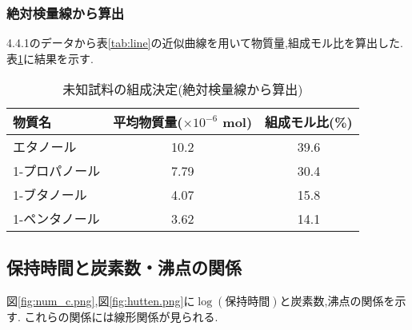 \subsubsection{絶対検量線から算出}
4.4.1のデータから表\ref{tab:line}の近似曲線を用いて物質量,組成モル比を算出した.
表\ref{tab:miti_zettai}に結果を示す.
\begin{table}[h]
   \caption{未知試料の組成決定(絶対検量線から算出)}
   \label{tab:miti_zettai}
   \centering
   \begin{tabular}{l|cc}
     \hline
     物質名 & 平均物質量($\times10^{-6}$ \si{\mole}) & 組成モル比(\%) \\
     \hline \hline
     エタノール & 10.2 & 39.6 \\
     1-プロパノール & 7.79 & 30.4 \\
     1-ブタノール & 4.07 & 15.8 \\
     1-ペンタノール & 3.62 & 14.1 \\
     \hline
   \end{tabular}
\end{table}
\subsection{保持時間と炭素数・沸点の関係}
図\ref{fig:num_c.png},図\ref{fig:hutten.png}に$\log {(保持時間)}$と炭素数,沸点の関係を示す.
これらの関係には線形関係が見られる.